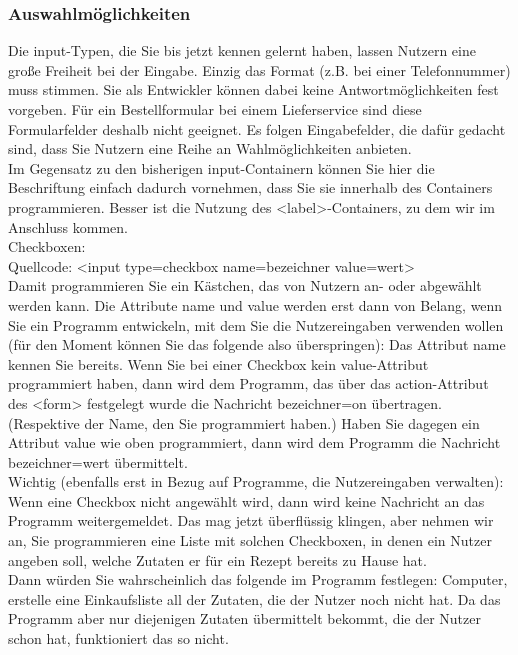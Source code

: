 \subsubsection{Auswahlmöglichkeiten}

Die input-Typen, die Sie bis jetzt kennen gelernt haben, lassen Nutzern eine große Freiheit bei der Eingabe. Einzig das Format (z.B. bei einer Telefonnummer) muss stimmen. Sie als Entwickler können dabei keine Antwortmöglichkeiten fest vorgeben. Für ein Bestellformular bei einem Lieferservice sind diese Formularfelder deshalb nicht geeignet. Es folgen Eingabefelder, die dafür gedacht sind, dass Sie Nutzern eine Reihe an Wahlmöglichkeiten anbieten.\\

Im Gegensatz zu den bisherigen input-Containern können Sie hier die Beschriftung einfach dadurch vornehmen, dass Sie sie innerhalb des Containers programmieren. Besser ist die Nutzung des <label>-Containers, zu dem wir im Anschluss kommen.\\

Checkboxen:\\

Quellcode: <input type=checkbox name=bezeichner value=wert>\\

Damit programmieren Sie ein Kästchen, das von Nutzern an- oder abgewählt werden kann.
Die Attribute name und value werden erst dann von Belang, wenn Sie ein Programm entwickeln, mit dem Sie die Nutzereingaben verwenden wollen (für den Moment können Sie das folgende also überspringen): Das Attribut name kennen Sie bereits. Wenn Sie bei einer Checkbox kein value-Attribut programmiert haben, dann wird dem Programm, das über das action-Attribut des <form> festgelegt wurde die Nachricht bezeichner=on übertragen. (Respektive der Name, den Sie programmiert haben.) Haben Sie dagegen ein Attribut value wie oben programmiert, dann wird dem Programm die Nachricht bezeichner=wert übermittelt.\\

Wichtig (ebenfalls erst in Bezug auf Programme, die Nutzereingaben verwalten): Wenn eine Checkbox nicht angewählt wird, dann wird keine Nachricht an das Programm weitergemeldet. Das mag jetzt überflüssig klingen, aber nehmen wir an, Sie programmieren eine Liste mit solchen Checkboxen, in denen ein Nutzer angeben soll, welche Zutaten er für ein Rezept bereits zu Hause hat. \\

Dann würden Sie wahrscheinlich das folgende im Programm festlegen: Computer, erstelle eine Einkaufsliste all der Zutaten, die der Nutzer noch nicht hat. Da das Programm aber nur diejenigen Zutaten übermittelt bekommt, die der Nutzer schon hat, funktioniert das so nicht.\\

